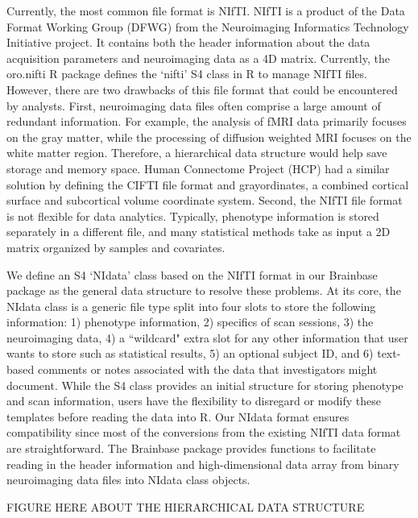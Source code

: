 \documentclass{nature}
\begin{document}
Currently, the most common file format is NIfTI.
NIfTI is a product of the Data Format Working Group
(DFWG) from the Neuroimaging Informatics Technology Initiative project. It
contains both the header information about the data acquisition
parameters and neuroimaging data as a 4D matrix.
Currently, the oro.nifti R package defines the `nifti'
S4 class in R to manage NIfTI files. However, there are two drawbacks
of this file format that could be encountered by analysts. First, neuroimaging
data files often comprise a large amount of
redundant information.
For example,
the analysis of fMRI data primarily focuses on the gray matter, while the
processing of diffusion weighted MRI focuses on the white matter region.
Therefore, a hierarchical data structure would help save storage and memory
space. Human Connectome Project (HCP) had a similar solution by defining the
CIFTI
file format and grayordinates, a combined cortical surface and subcortical
volume coordinate system\cite{Glasser2013The}.
Second, the NIfTI file format is not flexible for data analytics. Typically,
phenotype information is stored separately in a different file, and many
statistical
methods take as input a 2D matrix organized by samples and covariates.

We define an S4 `NIdata' class based on the NIfTI format
in our Brainbase package as
the general data structure to resolve these problems.
At its core, the NIdata class is a generic file type split into
four slots to store the following information: 1) phenotype
information, 2) specifics of scan sessions, 3) the neuroimaging data,
4) a ``wildcard" extra slot for any other information that user
wants to store such as statistical results, 5) an optional subject ID,
and 6) text-based comments or notes associated with the data that
investigators might document. While the
S4 class provides an initial structure for storing
phenotype and scan information, users have the flexibility to disregard or
modify these templates before reading the data into R.
Our NIdata format ensures compatibility since most of the conversions from
the existing NIfTI data format are
straightforward. The Brainbase package provides functions
to facilitate
reading in the header information and high-dimensional data array from binary
neuroimaging data files into NIdata class objects.

{\color{red}FIGURE HERE ABOUT THE HIERARCHICAL DATA STRUCTURE}
\end{document}
